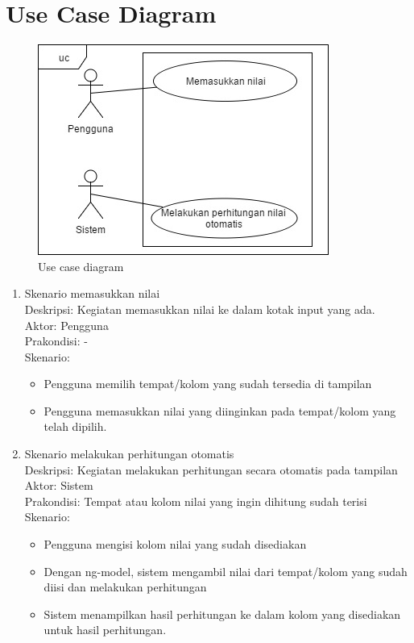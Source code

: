 \section{Use Case Diagram}
\label{sec: usecaseDiagram}

	\begin{figure}[H]
		\centering
		\includegraphics[scale=0.75]{Gambar/usecase}
		\caption{Use case diagram}
		\label{fig:usecase}
	\end{figure}
	
	\begin{enumerate}
		\item Skenario memasukkan nilai\\
			Deskripsi: Kegiatan memasukkan nilai ke dalam kotak input yang ada.\\
			Aktor: Pengguna\\
			Prakondisi: - \\
			Skenario:
			\begin{itemize}
				\item Pengguna memilih tempat/kolom yang sudah tersedia di tampilan
				\item Pengguna memasukkan nilai yang diinginkan pada tempat/kolom yang telah dipilih.
			\end{itemize}
		\item Skenario melakukan perhitungan otomatis\\
			Deskripsi: Kegiatan melakukan perhitungan secara otomatis pada tampilan\\
			Aktor: Sistem\\
			Prakondisi: Tempat atau kolom nilai yang ingin dihitung sudah terisi\\
			Skenario:
			\begin{itemize}
				\item Pengguna mengisi kolom nilai yang sudah disediakan
				\item Dengan ng-model, sistem mengambil nilai dari tempat/kolom yang sudah diisi dan melakukan perhitungan
				\item Sistem menampilkan hasil perhitungan ke dalam kolom yang disediakan untuk hasil perhitungan.
			\end{itemize}
	\end{enumerate}
	